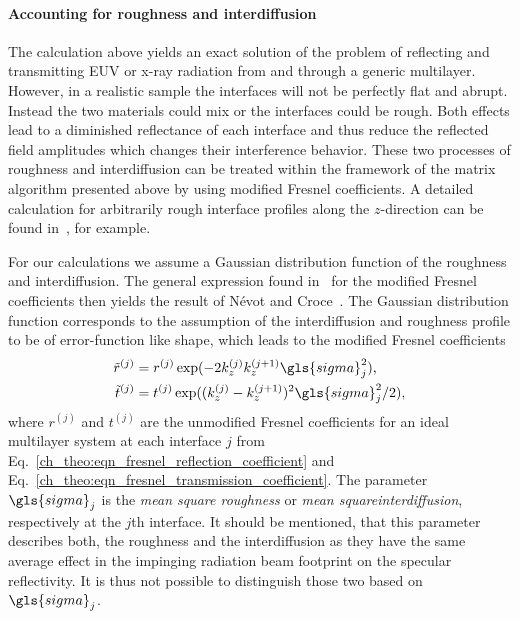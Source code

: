 \paragraph{Accounting for roughness and interdiffusion}
The calculation above yields an exact solution of the problem of reflecting and transmitting EUV or x-ray radiation from and through a generic multilayer. However, in a realistic sample the interfaces will not be perfectly flat and abrupt. Instead the two materials could mix or the interfaces could be rough. Both effects lead to a diminished reflectance of each interface and thus reduce the reflected field amplitudes which changes their interference behavior. These two processes of roughness and interdiffusion can be treated within the framework of the matrix algorithm presented above by using modified Fresnel coefficients. A detailed calculation for arbitrarily rough interface profiles along the $z$-direction can be found in~\cite{vidal_metallic_1984}, for example.

For our calculations we assume a Gaussian distribution function of the roughness and interdiffusion. The general expression found in~\cite{vidal_metallic_1984} for the modified Fresnel coefficients then yields the result of N\'{e}vot and Croce~\cite{croce_p._etude_1976, nevot_l._caracterisation_1980}. The Gaussian distribution function corresponds to the assumption of the interdiffusion and roughness profile to be of error-function like shape, which leads to the modified Fresnel coefficients
\begin{align}
       \tilde{r}^{(j)} &= r^{(j)} \exp(-2 k_z^{(j)} k_z^{(j+1)} 
\gls{sigma}_j^2)\text{,} \nonumber \\
       \tilde{t}^{(j)} &= t^{(j)} \exp((k_z^{(j)} - k_z^{(j+1)})^2 \gls{sigma}_j^2/2) 
\text{,} \label{ch_theo:eqn_mod_fresnel}
\end{align}
where $r^{(j)}$ and $t^{(j)}$ are the unmodified Fresnel coefficients for an ideal multilayer system at each interface $j$ from Eq.~\eqref{ch_theo:eqn_fresnel_reflection_coefficient} and Eq.~\eqref{ch_theo:eqn_fresnel_transmission_coefficient}. The parameter $\gls{sigma}_j$ is the \emph{mean square roughness} or \emph{mean squareinterdiffusion}, respectively at the $j$th interface. It should be mentioned, that this parameter describes both, the roughness and the interdiffusion as they have the same average effect in the impinging radiation beam footprint on the specular reflectivity. It is thus not possible to distinguish those two based on $\gls{sigma}_j$.

